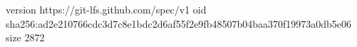 version https://git-lfs.github.com/spec/v1
oid sha256:ad2e210766cdc3d7c8e1bdc2d6af55f2e9fb48507b04baa370f19973a0db5e06
size 2872
